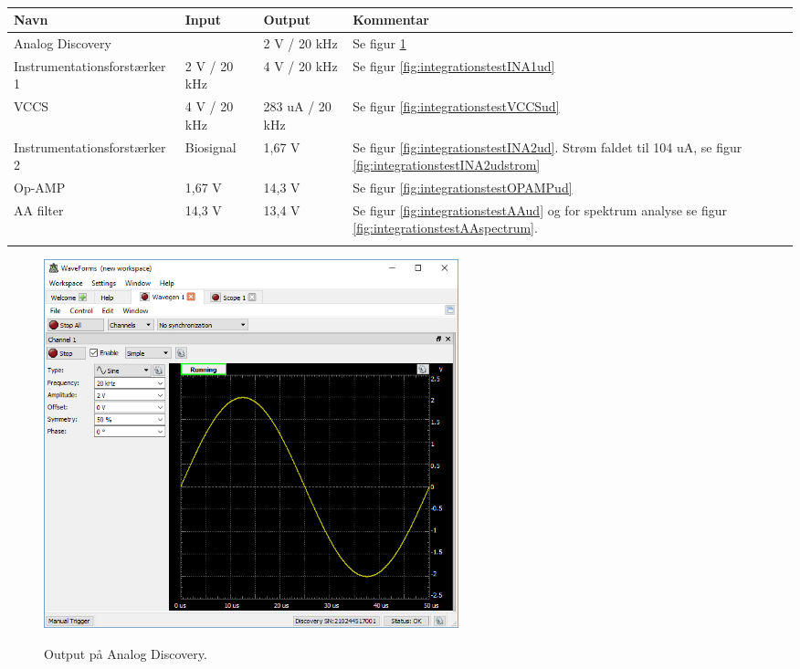 \begin{table}[H]
\center
\begin{tabularx}{\linewidth}{l  X  X X}
     \textbf{Navn}	&	\textbf{Input}		&	\textbf{Output} & \textbf{Kommentar}\\ \midrule
     
     Analog Discovery	&		&	2 V / 20 kHz      & Se figur \ref{fig:integrationstestADud}  \\   \addlinespace[2mm]
     Instrumentationsforstærker 1	&	2 V / 20 kHz	&	4 V / 20 kHz      & Se figur \ref{fig:integrationstestINA1ud}  \\   \addlinespace[2mm]
     VCCS	&	4 V / 20 kHz	&	283 uA / 20 kHz      & Se figur  \ref{fig:integrationstestVCCSud}  \\   \addlinespace[2mm]
     Instrumentationsforstærker 2	&	Biosignal	&	1,67 V      & Se figur  \ref{fig:integrationstestINA2ud}. Strøm faldet til 104 uA, se figur \ref{fig:integrationstestINA2udstrom}  \\   \addlinespace[2mm]
     Op-AMP	&	1,67 V 	&	14,3 V      & Se figur  \ref{fig:integrationstestOPAMPud}  \\   \addlinespace[2mm]	
     AA filter	&	14,3 V 	&	13,4 V      & Se figur  \ref{fig:integrationstestAAud} og for spektrum analyse se figur \ref{fig:integrationstestAAspectrum}.  \\   \addlinespace[2mm]
     \bottomrule                                                                                                                   
    \end{tabularx}
    \caption {}
    \label{tab:sw1}
	
\end{table}


\begin{figure}[H] 
\centering
{\includegraphics[width=12cm]
{Figure/integrationstestADud}}
\caption{Output på Analog Discovery.}
\label{fig:integrationstestADud}
\end{figure}

